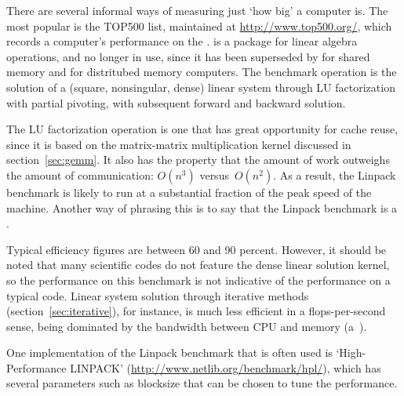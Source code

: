 
There are several informal ways of measuring just `how big' a computer
is. The most popular is the TOP500 list, maintained at
\url{http://www.top500.org/}, which records a computer's performance
on the .  is a
package for linear algebra operations, and no longer in use, since it
has been superseded by  for shared memory and
 for distritubed memory computers. The benchmark
operation is the solution of a (square, nonsingular, dense) linear
system through LU factorization with partial pivoting, with subsequent
forward and backward solution.

The LU factorization operation is one that has great opportunity for
cache reuse, since it is based on the matrix-matrix multiplication
kernel discussed in section~\ref{sec:gemm}. It also has the property
that the amount of work outweighs the amount of communication:
$O(n^3)$ versus~$O(n^2)$.
As a result, the 
Linpack benchmark is likely to run at a substantial fraction of the
peak speed of the machine. Another way of phrasing this is to say that
the Linpack benchmark is a .

Typical efficiency figures are between 60 and 90 percent. However, it
should be noted that many scientific codes do not feature the dense
linear solution kernel, so the performance on this benchmark is not
indicative of the performance on a typical code. Linear system
solution through iterative methods (section~\ref{sec:iterative}), for
instance, is much less efficient in a flops-per-second sense, being
dominated by the bandwidth between CPU and memory
(a~).

One implementation of the Linpack benchmark that is often used is
`High-Performance LINPACK'
(\url{http://www.netlib.org/benchmark/hpl/}), which has several
parameters such as blocksize that can be chosen to tune the performance.


